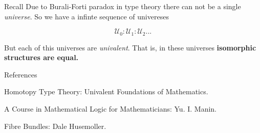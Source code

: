 \documentclass[10pt]{beamer}
\newcommand{\U}{\mathscr{U}}
\theoremstyle{definition}
\theoremstyle{definition}
\begin{document}
\begin{frame}

\begin{block}{Recall}
Due to Burali-Forti paradox in type theory there can not be a single \emph{universe}. So
we have a infinte sequence of univereses 

\[ \U_0 : \U_1 : \U_2 ...\]
\end{block}

\begin{block}{}
But each of this universes are \emph{univalent}. That is, in these universes 
\textbf{isomorphic structures are equal.}
\end{block}




\end{frame}


\begin{frame}{References}

\begin{thebibliography}{99}

Homotopy Type Theory: Univalent Foundations of Mathematics.

A Course in Mathematical Logic for Mathematicians: Yu. I. Manin. 

Fibre Bundles: Dale Husemoller.


\end{thebibliography}
\end{frame}
\end{document}
